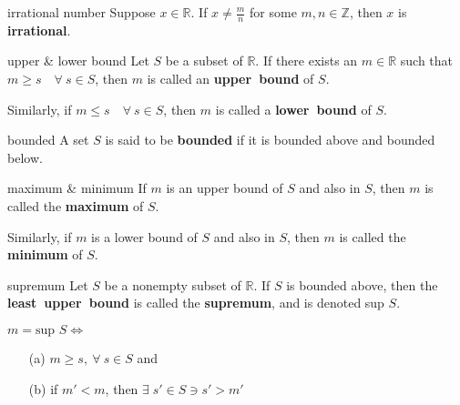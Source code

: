 \documentclass[avery5371,grid]{flashcards}
\newcommand{\Z}{\mathbb{Z}}
\newcommand{\R}{\mathbb{R}}
\begin{document}

\begin{flashcard}[Definition]{irrational number}
Suppose $x \in \R$.  If $x \neq \frac{m}{n}$ for some $m,n \in 
\Z$, then $x$ is \mbox{\textbf{irrational}}.
\end{flashcard}

\begin{flashcard}[Definition]{upper \& lower bound}
Let $S$ be a subset of $\R$.  If there exists an $m \in \R$ such that
$m \geq s \quad \forall \ s \in S$, then $m$ is called an
\mbox{\textbf{upper bound}} of $S$.

\bigskip
Similarly, if $m \leq s \quad \forall \ s \in S$, then $m$ is called a
\mbox{\textbf{lower bound}} of $S$.
\end{flashcard}

\begin{flashcard}[Definition]{bounded}
A set $S$ is said to be \textbf{bounded} if it is bounded above
and bounded below.
\end{flashcard}

\begin{flashcard}[Definition]{maximum \& minimum}
If $m$ is an upper bound of $S$ and also in $S$, then
$m$ is called the \mbox{\textbf{maximum}} of $S$.

\bigskip
Similarly, if $m$ is a lower bound of $S$ and also in $S$, 
then $m$ is called the \mbox{\textbf{minimum}} of $S$.
\end{flashcard}

\begin{flashcard}[Definition]{supremum}
Let $S$ be a nonempty subset of $\R$.  If $S$ is bounded above, then
the \mbox{\textbf{least upper bound}} is called the
\mbox{\textbf{supremum}}, and is denoted sup $S$.

\medskip
$m = \textrm{sup } S \Leftrightarrow$
\begin{enumerate}
 \item[(a)] $m \geq s, \ \forall \ s \in S$ and
 \item[(b)] if $m'<m$, then $\exists \; s' \in S \ni s'>m'$
\end{enumerate}
\end{flashcard}
\end{document}
